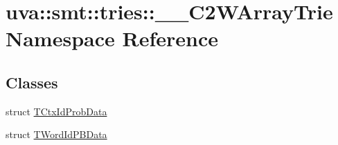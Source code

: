 \hypertarget{namespaceuva_1_1smt_1_1tries_1_1_____c2_w_array_trie}{}\section{uva\+:\+:smt\+:\+:tries\+:\+:\+\_\+\+\_\+\+C2\+W\+Array\+Trie Namespace Reference}
\label{namespaceuva_1_1smt_1_1tries_1_1_____c2_w_array_trie}
\subsection*{Classes}
\begin{DoxyCompactItemize}
\item 
struct \hyperlink{structuva_1_1smt_1_1tries_1_1_____c2_w_array_trie_1_1_t_ctx_id_prob_data}{T\+Ctx\+Id\+Prob\+Data}
\item 
struct \hyperlink{structuva_1_1smt_1_1tries_1_1_____c2_w_array_trie_1_1_t_word_id_p_b_data}{T\+Word\+Id\+P\+B\+Data}
\end{DoxyCompactItemize}
